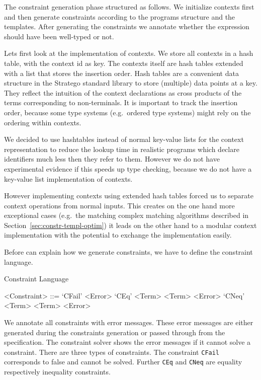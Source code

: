 The constraint generation phase structured as follows. We initialize
contexts first and then generate constraints according to the programs
structure and the templates. After generating the constraints we
annotate whether the expression should have been well-typed or not.

Lets first look at the implementation of contexts. We store all
contexts in a hash table, with the context id as key. The contexts
itself are hash tables extended with a list that stores the insertion
order. Hash tables are a convenient data structure in the Stratego
standard library to store (multiple) data points at a key. They
reflect the intuition of the context declarations as cross products of
the terms corresponding to non-terminals. It is important to track the
insertion order, because some type systems (e.g.\ ordered type
systems) might rely on the ordering within contexts.

We decided to use hashtables instead of normal key-value lists for the
context representation to reduce the lookup time in realistic programs
which declare identifiers much less then they refer to them. However
we do not have experimental evidence if this speeds up type checking,
because we do not have a key-value list implementation of contexts.

However implementing contexts using extended hash tables forced us to
separate context operations from normal inputs. This creates on the
one hand more exceptional cases (e.g.\ the matching complex matching
algorithms described in Section~\ref{sec:constr-templ-optim}) it leads
on the other hand to a modular context implementation with the
potential to exchange the implementation easily.

Before can explain how we generate constraints, we have to define the
constraint language.

\begin{definition}{Constraint Language}
  \begin{grammar}
    <Constraint> ::= `CFail' <Error>
    \alt `CEq' <Term> <Term> <Error>
    \alt `CNeq' <Term> <Term> <Error>
  \end{grammar}
\end{definition}

We annotate all constraints with error messages. These error messages
are either generated during the constraints generation or passed
through from the specification. The constraint solver shows the error
messages if it cannot solve a constraint. There are three types of
constraints. The constraint \verb|CFail| corresponds to false and
cannot be solved. Further \verb|CEq| and \verb|CNeq| are equality
respectively inequality constraints.

